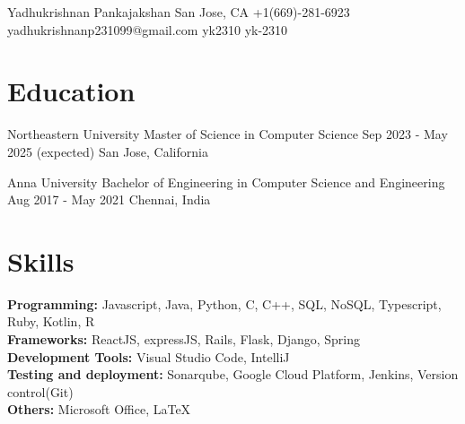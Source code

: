\documentclass[letterpaper]{resume_config}
\begin{document}
\Header
    {Yadhukrishnan Pankajakshan} %
    {San Jose, CA} %
    {+1(669)-281-6923} %
    {yadhukrishnanp231099@gmail.com} %
    {yk2310} %
    {yk-2310}
\vspace{-10pt}

\section{Education}

\EducationExperience
    {Northeastern University} %
    {Master of Science in Computer Science} %
    {Sep 2023 - May 2025 \footnotesize{(expected)}} %
    {San Jose, California} %

\EducationExperience
    {Anna University} %
    {Bachelor of Engineering in Computer Science and Engineering} %
    {Aug 2017 - May 2021} %
    {Chennai, India} %
\vspace{-15pt}


\section{Skills}
\textbf{Programming: }{Javascript, Java, Python, C, C++, SQL, NoSQL, Typescript, Ruby, Kotlin, R}\\
\textbf{Frameworks: }{ReactJS, expressJS, Rails, Flask, Django, Spring}\\
\textbf{Development Tools: }{Visual Studio Code, IntelliJ}\\
\textbf{Testing and deployment: }{Sonarqube, Google Cloud Platform, Jenkins, Version control(Git)}\\
\textbf{Others: }{Microsoft Office, LaTeX}\\
\vspace{-10pt}

\end{document}
